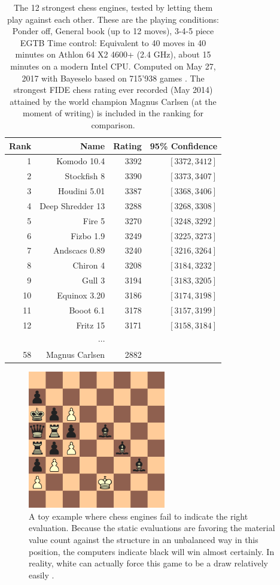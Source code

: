 \begin{table}[]
\centering
\caption[Strongest chess engines]{The 12 strongest chess engines, tested by letting them play against each other. These are the playing conditions: Ponder off, General book (up to 12 moves), 3-4-5 piece EGTB
Time control: Equivalent to 40 moves in 40 minutes on Athlon 64 X2 4600+ (2.4 GHz), about 15 minutes on a modern Intel CPU.
Computed on May 27, 2017 with Bayeselo based on 715'938 games \cite{engines}. The strongest FIDE chess rating ever recorded (May 2014) attained by the world champion Magnus Carlsen (at the moment of writing) is included in the ranking for comparison.}
\label{tab:engines}
\begin{tabular}{rrrr}
\toprule
\textbf{Rank} & \textbf{Name} & \textbf{Rating} &\textbf{95\% Confidence} \\
\midrule
1 & Komodo 10.4      & 3392 & $[3372,3412]$ \\
2 & Stockfish 8      & 3390 &  $[3373,3407]$\\
3 & Houdini 5.01     & 3387 & $[3368,3406]$ \\
4 & Deep Shredder 13 & 3288 & $[3268,3308]$ \\
5 & Fire 5           & 3270 & $[3248,3292]$ \\
6 & Fizbo 1.9        & 3249 & $[3225,3273]$ \\
7 & Andscacs 0.89    & 3240 & $[3216,3264]$ \\
8 & Chiron 4         & 3208 & $[3184,3232]$ \\
9 & Gull 3           & 3194 & $[3183,3205]$ \\
10 & Equinox 3.20     & 3186 & $[3174,3198]$ \\
11 & Booot 6.1        & 3178 &  $[3157,3199]$\\
12 & Fritz 15         & 3171 & $[3158,3184]$ \\
&$\cdots$&&\\
58 & Magnus Carlsen & 2882 &\\
\bottomrule
\end{tabular}
\end{table}

\begin{figure}
\centering
\includegraphics[width=6cm]{fig/diagram_eval}
\caption[Toy example]{A toy example where chess engines fail to indicate the right evaluation. Because the static evaluations are favoring the material value count against the structure in an unbalanced way in this position, the computers indicate black will win almost certainly. In reality, white can actually force this game to be a draw relatively easily \cite{toy}.}
\label{fig:toy}
\end{figure}